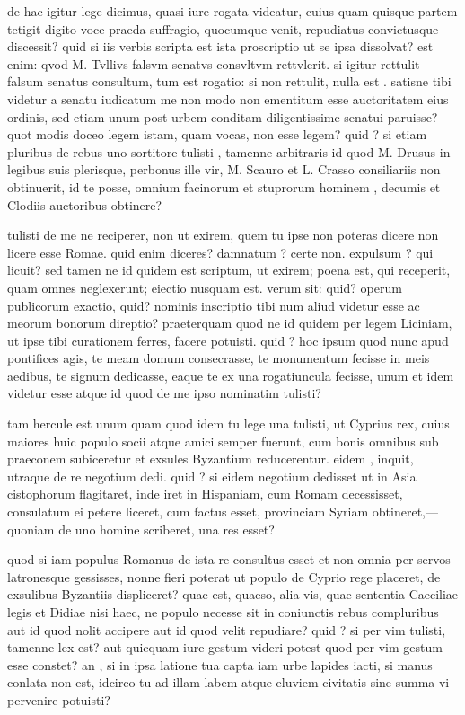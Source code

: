  de hac igitur lege dicimus, quasi iure rogata videatur, cuius quam quisque partem tetigit digito voce praeda suffragio, quocumque venit, repudiatus convictusque discessit? quid si iis verbis scripta est ista proscriptio ut se ipsa dissolvat? est enim: qvod M. Tvllivs falsvm senatvs consvltvm rettvlerit. si igitur rettulit falsum senatus consultum, tum est rogatio: si non rettulit, nulla est . satisne tibi videtur a senatu iudicatum me non modo non ementitum esse auctoritatem eius ordinis, sed etiam unum post urbem conditam diligentissime senatui paruisse? quot modis doceo legem istam, quam vocas, non esse legem? quid ? si etiam pluribus de rebus uno sortitore tulisti , tamenne arbitraris id quod M. Drusus in legibus suis plerisque, perbonus ille vir, M. Scauro et L. Crasso consiliariis non obtinuerit, id te posse, omnium facinorum et stuprorum hominem , decumis et Clodiis auctoribus obtinere?

 tulisti de me ne reciperer, non ut exirem, quem tu ipse non poteras dicere non licere esse Romae. quid enim diceres? damnatum ? certe non. expulsum ? qui licuit? sed tamen ne id quidem est scriptum, ut exirem; poena est, qui receperit, quam omnes neglexerunt; eiectio nusquam est. verum sit: quid? operum publicorum exactio, quid? nominis inscriptio tibi num aliud videtur esse ac meorum bonorum direptio? praeterquam quod ne id quidem per legem Liciniam, ut ipse tibi curationem ferres, facere potuisti. quid ? hoc ipsum quod nunc apud pontifices agis, te meam domum consecrasse, te monumentum fecisse in meis aedibus, te signum dedicasse, eaque te ex una rogatiuncula fecisse, unum et idem videtur esse atque id quod de me ipso nominatim tulisti?

 tam hercule est unum quam quod idem tu lege una tulisti, ut Cyprius rex, cuius maiores huic populo socii atque amici semper fuerunt, cum bonis omnibus sub praeconem subiceretur et exsules Byzantium reducerentur. eidem , inquit, utraque de re negotium dedi. quid ? si eidem negotium dedisset ut in Asia cistophorum flagitaret, inde iret in Hispaniam, cum Romam decessisset, consulatum ei petere liceret, cum factus esset, provinciam Syriam obtineret,—quoniam de uno homine scriberet, una res esset?

 quod si iam populus Romanus de ista re consultus esset et non omnia per servos latronesque gessisses, nonne fieri poterat ut populo de Cyprio rege placeret, de exsulibus Byzantiis displiceret? quae est, quaeso, alia vis, quae sententia Caeciliae legis et Didiae nisi haec, ne populo necesse sit in coniunctis rebus compluribus aut id quod nolit accipere aut id quod velit repudiare? quid ? si per vim tulisti, tamenne lex est? aut quicquam iure gestum videri potest quod per vim gestum esse constet? an , si in ipsa latione tua capta iam urbe lapides iacti, si manus conlata non est, idcirco tu ad illam labem atque eluviem civitatis sine summa vi pervenire potuisti?

